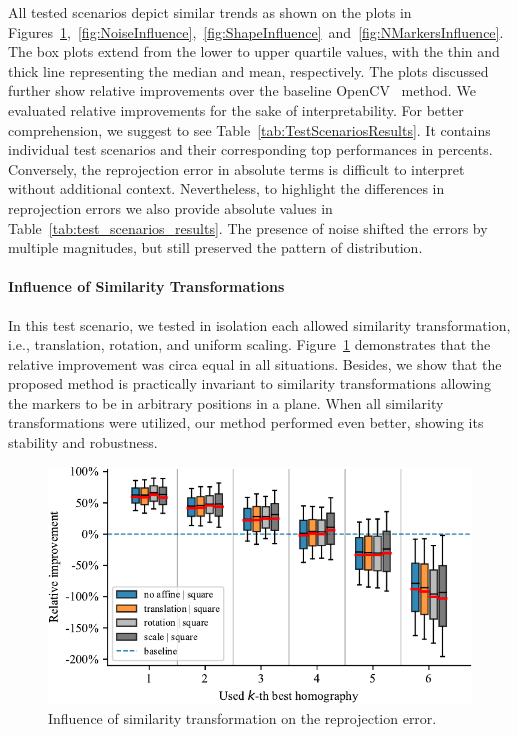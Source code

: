 All tested scenarios depict similar trends as shown on the plots in Figures~\ref{fig:SimilarityTransformInfluence},~\ref{fig:NoiseInfluence},~\ref{fig:ShapeInfluence}~and~\ref{fig:NMarkersInfluence}. The box plots extend from the lower to upper quartile values, with the thin and thick line representing the median and mean, respectively. The plots discussed further show relative improvements over the baseline OpenCV~\cite{bradski2008learning} method. We evaluated relative improvements for the sake of interpretability. For better comprehension, we suggest to see Table~\ref{tab:TestScenariosResults}. It contains individual test scenarios and their corresponding top performances in percents. Conversely, the reprojection error in absolute terms is difficult to interpret without additional context. Nevertheless, to highlight the differences in reprojection errors we also provide absolute values in Table~\ref{tab:test_scenarios_results}. The presence of noise shifted the errors by multiple magnitudes, but still preserved the pattern of distribution.

\paragraph{Influence of Similarity Transformations}
In this test scenario, we tested in isolation each allowed similarity transformation, i.e., translation, rotation, and uniform scaling. Figure~\ref{fig:SimilarityTransformInfluence} demonstrates that the relative improvement was circa equal in all situations. Besides, we show that the proposed method is practically invariant to similarity transformations allowing the markers to be in arbitrary positions in a plane. When all similarity transformations were utilized, our method performed even better, showing its stability and robustness.

\begin{figure}[t]
    \centering
    \includegraphics[width=\boxplotimgwidth]{figures/homography/similarity_transform_influence.pdf}
    \caption{Influence of similarity transformation on the reprojection error.}
    \label{fig:SimilarityTransformInfluence}
\end{figure}

